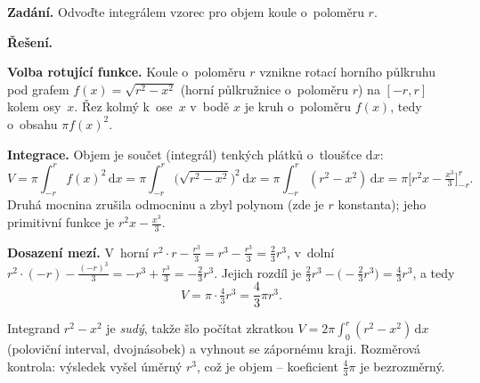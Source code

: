 \documentclass[11pt,a4paper]{article}
\begin{document}
\begin{priklad}
\textbf{Zadání.} Odvoďte integrálem vzorec pro objem koule o~poloměru $r$.

\textbf{Řešení.}\par
\textbf{Volba rotující funkce.} Koule o~poloměru $r$ vznikne rotací horního půlkruhu pod grafem $f(x)=\sqrt{r^2-x^2}$ (horní půlkružnice o~poloměru $r$) na $[-r,r]$ kolem osy~$x$. Řez kolmý k~ose~$x$ v~bodě $x$ je kruh o~poloměru $f(x)$, tedy o~obsahu $\pi f(x)^2$.\par
\textbf{Integrace.} Objem je součet (integrál) tenkých plátků o~tloušťce $\mathrm{d}x$:
\[
  V=\pi\int_{-r}^{r} f(x)^2\,\mathrm{d}x
   =\pi\int_{-r}^{r}\big(\sqrt{r^2-x^2}\big)^2\,\mathrm{d}x
   =\pi\int_{-r}^{r}(r^2-x^2)\,\mathrm{d}x
   =\pi\Big[r^2x-\tfrac{x^3}{3}\Big]_{-r}^{r}.
\]
Druhá mocnina zrušila odmocninu a zbyl polynom (zde je $r$ konstanta); jeho primitivní funkce je $r^2x-\tfrac{x^3}{3}$.\par
\textbf{Dosazení mezí.} V~horní $r^2\!\cdot\!r-\tfrac{r^3}{3}=r^3-\tfrac{r^3}{3}=\tfrac23 r^3$, v~dolní $r^2\!\cdot\!(-r)-\tfrac{(-r)^3}{3}=-r^3+\tfrac{r^3}{3}=-\tfrac23 r^3$. Jejich rozdíl je $\tfrac23 r^3-\big(-\tfrac23 r^3\big)=\tfrac43 r^3$, a tedy
\[
  V=\pi\cdot\tfrac43 r^3=\frac{4}{3}\pi r^3.
\]

\begin{center}
\end{center}
\end{priklad}

\begin{poznamka}
Integrand $r^2-x^2$ je \emph{sudý}, takže šlo počítat zkratkou $V=2\pi\int_0^r(r^2-x^2)\,\mathrm{d}x$ (poloviční interval, dvojnásobek) a vyhnout se zápornému kraji. Rozměrová kontrola: výsledek vyšel úměrný $r^3$, což je objem -- koeficient $\tfrac43\pi$ je bezrozměrný.
\end{poznamka}
\end{document}
